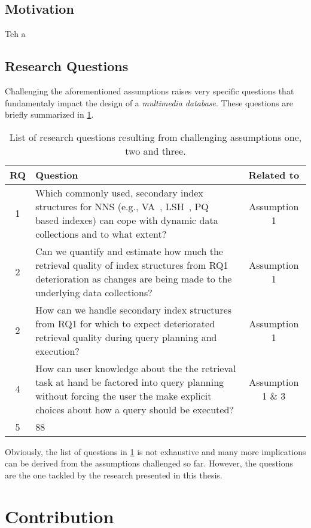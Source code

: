 \subsection{Motivation}

Teh a


\subsection{Research Questions}

Challenging the aforementioned assumptions raises very specific questions that fundamentaly impact the design of a \emph{multimedia database}. These questions are briefly summarized in \cref{table:research_questions}.

\begin{table}[h!]
    \centering
    \caption{List of research questions resulting from challenging assumptions one, two and three.}
    \begin{tabular}{|c|p{10cm}|c|} 
     \hline
     \textbf{RQ} & \textbf{Question} & \textbf{Related to} \\ [0.5ex] 
     \hline\hline
     1 & Which commonly used, secondary index structures for NNS (e.g., VA~\cite{Weber:1998va}, LSH~\cite{Indyk:1998lsh}, PQ~\cite{jegou:2011pq} based indexes) can cope with dynamic data collections and to what extent? & Assumption 1\\ 
     2 & Can we quantify and estimate how much the retrieval quality of index structures from RQ1 deterioration as changes are being made to the underlying data collections? & Assumption 1 \\ 
     2 & How can we handle secondary index structures from RQ1 for which to expect deteriorated retrieval quality during query planning and execution? & Assumption 1 \\
     4 & How can user knowledge about the the retrieval task at hand be factored into query planning without forcing the user the make explicit choices about how a query should be executed? & Assumption 1 \& 3 \\
     5 & 88 & \\ 
     \hline
    \end{tabular}
    \label{table:research_questions}
\end{table}

Obviously, the list of questions in \cref{table:research_questions} is not exhaustive and many more implications can be derived from the assumptions challenged so far. However, the questions are the one tackled by the research presented in this thesis.


\section{Contribution}

